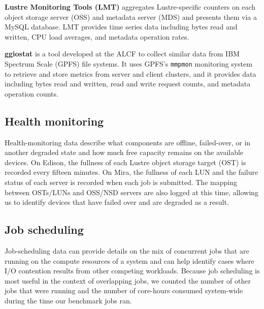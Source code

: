 \label{sec:methods/lmt}
\textbf{Lustre Monitoring Tools (LMT)} aggregates Lustre-specific counters on each object storage server (OSS) and metadata server (MDS) and presents them via a MySQL database.
LMT provides time series data including bytes read and written, CPU load averages, and metadata operation rates.

\label{sec:methods/ggiostat}
\textbf{ggiostat} is a tool developed at the ALCF to collect similar data from IBM Spectrum Scale (GPFS) file systems.
It uses GPFS's \texttt{mmpmon} monitoring system to retrieve and store metrics from server and client clusters, and it provides data including bytes read and written, read and write request counts, and metadata operation counts.

\subsection{Health monitoring} \label{sec:methods/health}

Health-monitoring data describe what components are offline, failed-over, or in another degraded state and how much free capacity remains on the available devices.
On Edison, the fullness of each Lustre object storage target (OST) is recorded every fifteen minutes.  
On Mira, the fullness of each LUN and the failure status of each server is recorded when each job is submitted.
The mapping between OSTs/LUNs and OSS/NSD servers are also logged at this time, allowing us to identify devices that have failed over and are degraded as a result.

\subsection{Job scheduling} \label{sec:methods/scheduling}

Job-scheduling data can provide details on the mix of concurrent jobs that are running on the compute resources of a system and can help identify cases where I/O contention results from other competing workloads.
Because job scheduling is most useful in the context of overlapping jobs, we counted the number of other jobs that were running and the number of core-hours consumed system-wide during the time our benchmark jobs ran.


